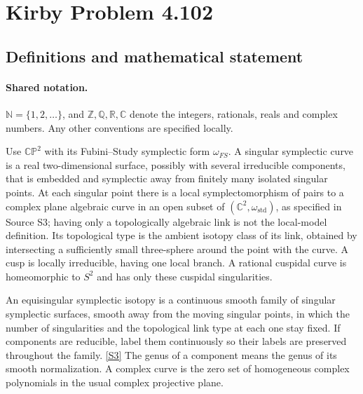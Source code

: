 \documentclass[11pt]{article}
\newcommand{\sref}[2]{\hyperlink{source:#1:#2}{[S#2]}}
\begin{document}
\section{Kirby Problem 4.102}\label{statement}

\subsection{Definitions and mathematical statement}

\paragraph{Shared notation.}$\mathbb N=\{1,2,\ldots\}$, and $\mathbb Z,\mathbb Q,\mathbb R,\mathbb C$ denote the integers, rationals, reals and complex numbers. Any other conventions are specified locally.


Use $\mathbb{CP}^2$ with its Fubini--Study symplectic form $\omega_{FS}$. A singular symplectic curve is a real two-dimensional surface, possibly with several irreducible components, that is embedded and symplectic away from finitely many isolated singular points. At each singular point there is a local symplectomorphism of pairs to a complex plane algebraic curve in an open subset of $(\mathbb C^2,\omega_{\mathrm{std}})$, as specified in Source S3; having only a topologically algebraic link is not the local-model definition. Its topological type is the ambient isotopy class of its link, obtained by intersecting a sufficiently small three-sphere around the point with the curve. A cusp is locally irreducible, having one local branch. A rational cuspidal curve is homeomorphic to $S^2$ and has only these cuspidal singularities.

An equisingular symplectic isotopy is a continuous smooth family of singular symplectic surfaces, smooth away from the moving singular points, in which the number of singularities and the topological link type at each one stay fixed. If components are reducible, label them continuously so their labels are preserved throughout the family. \sref{statement}{3} The genus of a component means the genus of its smooth normalization. A complex curve is the zero set of homogeneous complex polynomials in the usual complex projective plane.
\end{document}
